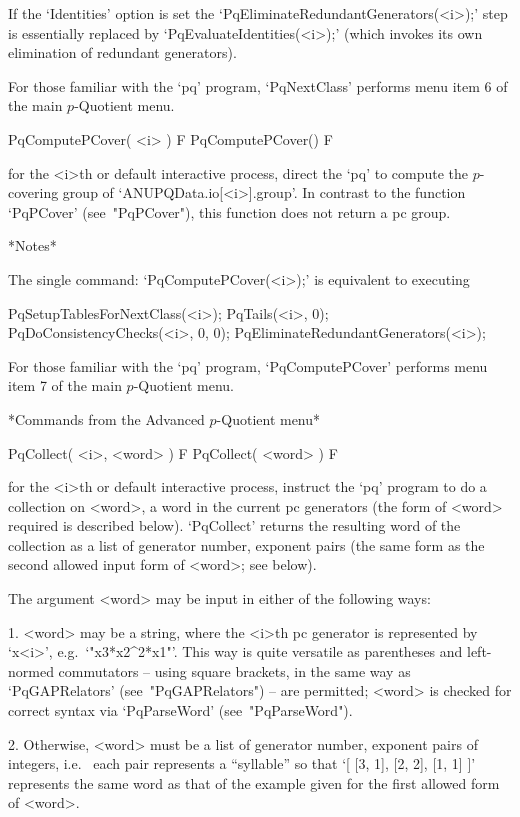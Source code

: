 If the `Identities' option is set the `PqEliminateRedundantGenerators(<i>);'
step is essentially replaced by `PqEvaluateIdentities(<i>);' (which invokes
its own elimination of redundant generators).

For those familiar with the `pq' program, `PqNextClass' performs menu item
6 of the main $p$-Quotient menu.

\>PqComputePCover( <i> ) F
\>PqComputePCover() F

for the <i>th or default interactive {\ANUPQ} process, direct the `pq' to
compute the $p$-covering group of `ANUPQData.io[<i>].group'.  In contrast
to the function  `PqPCover'  (see~"PqPCover"),  this  function  does  not
return a {\GAP} pc group.

*Notes*

The single command: `PqComputePCover(<i>);' is equivalent to executing
\goodbreak%

PqSetupTablesForNextClass(<i>);
PqTails(<i>, 0);
PqDoConsistencyChecks(<i>, 0, 0);
PqEliminateRedundantGenerators(<i>);

For those familiar with the `pq' program, `PqComputePCover' performs  menu
item 7 of the main $p$-Quotient menu.

*Commands from the Advanced $p$-Quotient menu*

\>PqCollect( <i>, <word> ) F
\>PqCollect( <word> ) F

for the <i>th or default interactive {\ANUPQ} process, instruct the  `pq'
program to do a collection on <word>, a word in the current pc generators
(the form of <word> required is described below). `PqCollect' returns the
resulting word of the collection as a list of generator number,  exponent
pairs (the same form as the second allowed  input  form  of  <word>;  see
below).

The argument <word> may be input in either of the following ways:

\beginlist%

\item{1.}
<word> may be a string, where the <i>th pc generator  is  represented  by
`x<i>', e.g.~`"x3*x2^2*x1"'. This way is quite versatile  as  parentheses
and left-normed commutators -- using square brackets, in the same way  as
`PqGAPRelators' (see~"PqGAPRelators") -- are permitted; <word> is checked
for correct syntax via `PqParseWord' (see~"PqParseWord").

\item{2.}
Otherwise, <word> must be a list of generator number, exponent  pairs  of
integers, i.e.~ each pair represents a ``syllable'' so that  `[  [3,  1],
[2, 2], [1, 1] ]' represents the same word as that of the  example  given
for the first allowed form of <word>.

